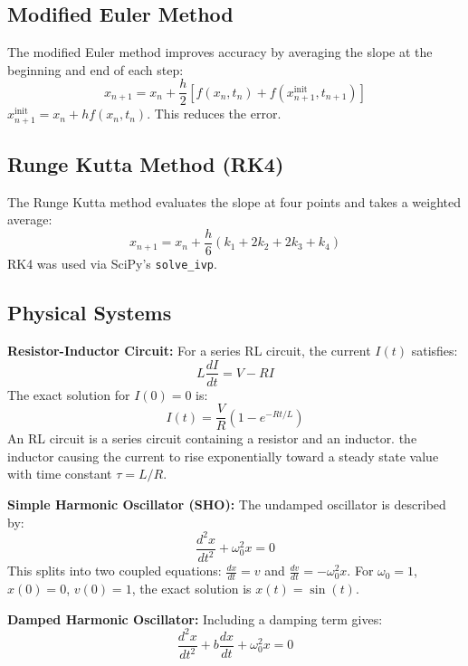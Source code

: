 \documentclass[12pt,a4paper]{article}
\begin{document}
	\subsection*{Modified Euler Method}
	The modified Euler method improves accuracy by averaging the slope at the beginning and end of each step:
	\begin{equation}
		x_{n+1} = x_n + \frac{h}{2}\left[f(x_n,t_n) + f(x^{\text{init}}_{n+1},t_{n+1})\right]
		\label{modified_euler}
	\end{equation}
	\(x^{\text{init}}_{n+1} = x_n + h f(x_n,t_n)\). This reduces the error.
	
	\subsection*{Runge Kutta Method (RK4)}
	The Runge Kutta method evaluates the slope at four points and takes a weighted average:
	\begin{equation}
		x_{n+1} = x_n + \frac{h}{6}(k_1 + 2k_2 + 2k_3 + k_4)
		\label{RK4}
	\end{equation}
	RK4 was used via SciPy's \texttt{solve\_ivp}.
	
	\subsection*{Physical Systems}
	\textbf{Resistor-Inductor Circuit:}
	For a series RL circuit, the current \(I(t)\) satisfies:
	\begin{equation}
		L\frac{dI}{dt} = V - RI
		\label{RL_ode}
	\end{equation}
	The exact solution for \(I(0)=0\) is:
	\begin{equation}
		I(t) = \frac{V}{R}\left(1 - e^{-Rt/L}\right)
		\label{I(t)exact}
	\end{equation}
	An RL circuit is a series circuit containing a resistor and an inductor. the inductor causing the current to rise exponentially toward a steady state value with time constant \(\tau = L/R\).
	
	
	\textbf{Simple Harmonic Oscillator (SHO):} The undamped oscillator is described by:
	\begin{equation}
		\frac{d^2x}{dt^2} + \omega_0^2 x = 0
		\label{SHO}
	\end{equation}
	This splits into two coupled equations: \(\frac{dx}{dt} = v\) and \(\frac{dv}{dt} = -\omega_0^2 x\). For \(\omega_0 = 1\), \(x(0)=0\), \(v(0)=1\), the exact solution is \(x(t) = \sin(t)\).
	
	\textbf{Damped Harmonic Oscillator:} Including a damping term gives:
	\begin{equation}
		\frac{d^2x}{dt^2} + b\frac{dx}{dt} + \omega_0^2 x = 0
		\label{damped}
	\end{equation}
	
\end{document}
